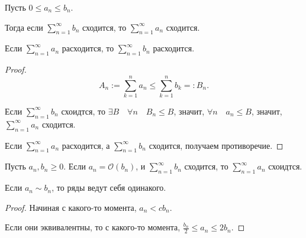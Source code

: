 \begin{theorem} \thmslashn

    Пусть $0 \le a_{n} \le b_{n}$.
    
    Тогда если $\sum\limits_{n=1}^{\infty} b_{n}$ сходится, то $\sum\limits_{n=1}^{\infty} a_{n}$ сходится.

    Если $\sum\limits_{n=1}^{\infty} a_{n}$ расходится, то $\sum\limits_{n=1}^{\infty} b_{n}$ расходится.
    \begin{proof} \thmslashn
    
        \[ A_{n} := \sum\limits_{k=1}^{n} a_{n} \le \sum\limits_{k=1}^{n} b_{k} =: B_{n} .\]

        Если $\sum\limits_{n=1}^{\infty} b_{n}$ схоидтся, то $\exists{B}\quad \forall{n}\quad B_{n} \le B$, значит, $\forall{n}\quad a_{n} \le B$, значит, $\sum\limits_{n=1}^{\infty} a_{n}$ сходится.

        Если $\sum\limits_{n=1}^{\infty} a_{n}$ расходится, а $\sum\limits_{n=1}^{\infty} b_{n}$ сходится, получаем противоречие.
    \end{proof}
\end{theorem}
\begin{consequence} \thmslashn

    Пусть $a_{n}, b_{n} \ge 0$. Если $a_{n} = \mathcal{O}(b_{n})$, и $\sum\limits_{n=1}^{\infty} b_{n}$ сходится, то $\sum\limits_{n=1}^{\infty} a_{n}$ схоидтся.

    Если $a_{n} \sim b_{n}$, то ряды ведут себя одинакого.
    \begin{proof} \thmslashn
    
        Начиная с какого-то момента, $a_{n} < c b_{n}$.

        Если они эквивалентны, то с какого-то момента, $\frac{b_{n}}{2} \le a_{n} \le 2b_{n}$.
    \end{proof}
\end{consequence}
